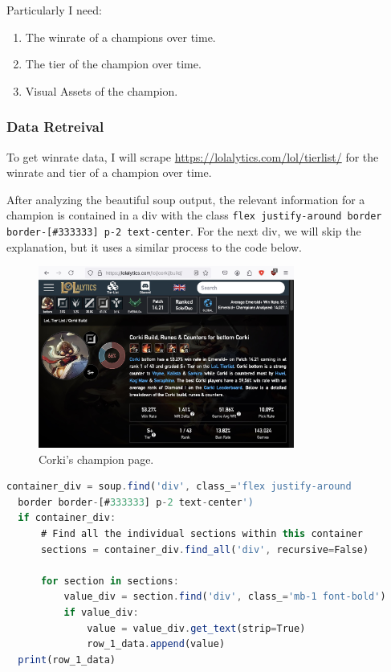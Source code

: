 \documentclass{article}
\begin{document}
Particularly I need:
\begin{enumerate}
  \item The winrate of a champions over time.
  \item The tier of the champion over time.
  \item Visual Assets of the champion.
\end{enumerate}

\subsubsection{Data Retreival} 
\label{subsubsec:Data Retreival}

To get winrate data, I will scrape \url{https://lolalytics.com/lol/tierlist/} for the winrate and tier of a champion over time.

After analyzing the beautiful soup output, the relevant information for a champion 
is contained in a div with the class \texttt{flex justify-around border border-[\#333333] p-2 text-center}.
For the next div, we will skip the explanation, but it uses a similar process to the code below.

\begin{figure}[ht] %
  \centering
  \includegraphics[width=0.75\textwidth]{figs/website.jpg}
  \caption{
      Corki's champion page.
  }
  \label{fig:fig1}
\end{figure}

\begin{lstlisting}[language=Javascript]
  container_div = soup.find('div', class_='flex justify-around 
  border border-[#333333] p-2 text-center')
  if container_div:
      # Find all the individual sections within this container
      sections = container_div.find_all('div', recursive=False)
      
      for section in sections:
          value_div = section.find('div', class_='mb-1 font-bold')
          if value_div:
              value = value_div.get_text(strip=True)
              row_1_data.append(value)
  print(row_1_data)
\end{lstlisting}
\end{document}
